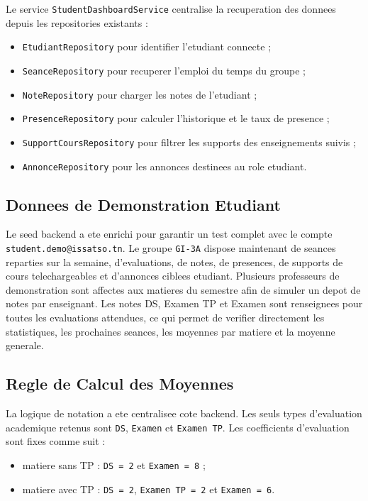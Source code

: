 \documentclass[12pt,a4paper]{report}
\begin{document}
Le service \texttt{StudentDashboardService} centralise la recuperation des donnees depuis les repositories existants :

\begin{itemize}[itemsep=0.3em]
    \item \texttt{EtudiantRepository} pour identifier l'etudiant connecte ;
    \item \texttt{SeanceRepository} pour recuperer l'emploi du temps du groupe ;
    \item \texttt{NoteRepository} pour charger les notes de l'etudiant ;
    \item \texttt{PresenceRepository} pour calculer l'historique et le taux de presence ;
    \item \texttt{SupportCoursRepository} pour filtrer les supports des enseignements suivis ;
    \item \texttt{AnnonceRepository} pour les annonces destinees au role etudiant.
\end{itemize}

\subsection{Donnees de Demonstration Etudiant}

Le seed backend a ete enrichi pour garantir un test complet avec le compte \texttt{student.demo@issatso.tn}. Le groupe \texttt{GI-3A} dispose maintenant de seances reparties sur la semaine, d'evaluations, de notes, de presences, de supports de cours telechargeables et d'annonces ciblees etudiant. Plusieurs professeurs de demonstration sont affectes aux matieres du semestre afin de simuler un depot de notes par enseignant. Les notes DS, Examen TP et Examen sont renseignees pour toutes les evaluations attendues, ce qui permet de verifier directement les statistiques, les prochaines seances, les moyennes par matiere et la moyenne generale.

\subsection{Regle de Calcul des Moyennes}

La logique de notation a ete centralisee cote backend. Les seuls types d'evaluation academique retenus sont \texttt{DS}, \texttt{Examen} et \texttt{Examen TP}. Les coefficients d'evaluation sont fixes comme suit :

\begin{itemize}[itemsep=0.3em]
    \item matiere sans TP : \texttt{DS = 2} et \texttt{Examen = 8} ;
    \item matiere avec TP : \texttt{DS = 2}, \texttt{Examen TP = 2} et \texttt{Examen = 6}.
\end{itemize}
\end{document}
